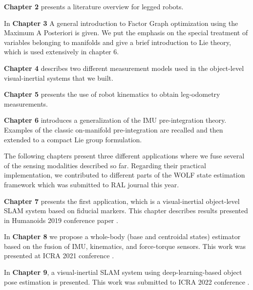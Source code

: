 \bigskip
\textbf{Chapter 2} presents a literature overview for legged robots. 

\bigskip
In \textbf{Chapter 3} A general introduction to Factor Graph optimization using the Maximum A Posteriori is given. We put the emphasis
on the special treatment of variables belonging to manifolds and give a brief introduction to Lie theory, which is used extensively in chapter 6.

\bigskip
\textbf{Chapter 4} describes two different measurement models used in the object-level visual-inertial systems that we built. 

\bigskip
\textbf{Chapter 5} presents the use of robot kinematics to obtain leg-odometry measurements. 

\bigskip
\textbf{Chapter 6} introduces a generalization of the IMU pre-integration theory. Examples of the classic on-manifold pre-integration are recalled and 
then extended to a compact Lie group formulation. 

\bigskip
The following chapters present three different applications where we fuse several of the sensing modalities described so far.
Regarding their practical implementation, we contributed to different parts of the WOLF state estimation framework \cite{sola2021wolf} which was submitted to RAL journal this year.

\bigskip
\textbf{Chapter 7} presents the first application, which is a visual-inertial object-level SLAM system based on fiducial markers. This chapter describes
results presented in Humanoids 2019 conference paper \cite{fourmy2019absolute}.

\bigskip
In \textbf{Chapter 8} we propose a whole-body (base and centroidal states) estimator based on the fusion of IMU, kinematics, and force-torque sensors. This
work was presented at ICRA 2021 conference \cite{fourmy2021contact}.

\bigskip
In \textbf{Chapter 9}, a visual-inertial SLAM system using deep-learning-based object pose estimation is presented. This work was submitted to ICRA 2022 conference 
\cite{debeunne2021cosyslam}.





